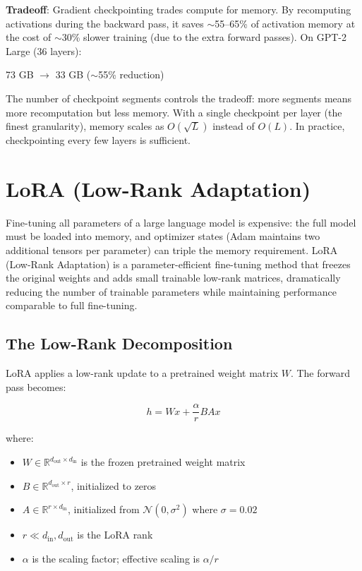 \begin{keyconcept}
  \textbf{Tradeoff}: Gradient checkpointing trades compute for memory.
  By recomputing activations during the backward pass, it saves
  $\sim$55--65\% of activation memory at the cost of $\sim$30\% slower
  training (due to the extra forward passes). On GPT-2 Large (36
  layers):

  \begin{center}
  73 GB $\rightarrow$ 33 GB ($\sim$55\% reduction)
  \end{center}

  The number of checkpoint segments controls the tradeoff: more segments
  means more recomputation but less memory. With a single checkpoint
  per layer (the finest granularity), memory scales as $O(\sqrt{L})$
  instead of $O(L)$. In practice, checkpointing every few layers is
  sufficient.
\end{keyconcept}

\section{LoRA (Low-Rank Adaptation)}

Fine-tuning all parameters of a large language model is expensive: the
full model must be loaded into memory, and optimizer states (Adam
maintains two additional tensors per parameter) can triple the memory
requirement. LoRA (Low-Rank Adaptation) is a parameter-efficient
fine-tuning method that freezes the original weights and adds small
trainable low-rank matrices, dramatically reducing the number of
trainable parameters while maintaining performance comparable to full
fine-tuning.

\subsection{The Low-Rank Decomposition}

LoRA applies a low-rank update to a pretrained weight matrix $W$. The
forward pass becomes:

\[
  h = Wx + \frac{\alpha}{r} BAx
\]

where:
\begin{itemize}
  \item $W \in \mathbb{R}^{d_{\text{out}} \times d_{\text{in}}}$ is the
        frozen pretrained weight matrix
  \item $B \in \mathbb{R}^{d_{\text{out}} \times r}$, initialized to zeros
  \item $A \in \mathbb{R}^{r \times d_{\text{in}}}$, initialized from
        $\mathcal{N}(0, \sigma^2)$ where $\sigma = 0.02$
  \item $r \ll d_{\text{in}}, d_{\text{out}}$ is the LoRA rank
  \item $\alpha$ is the scaling factor; effective scaling is $\alpha / r$
\end{itemize}

